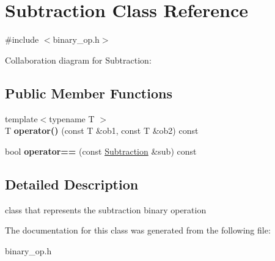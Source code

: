 \hypertarget{classSubtraction}{\section{Subtraction Class Reference}
\label{classSubtraction}
}


{\ttfamily \#include $<$binary\-\_\-op.\-h$>$}



Collaboration diagram for Subtraction\-:
\subsection*{Public Member Functions}
\begin{DoxyCompactItemize}
\item 
\hypertarget{classSubtraction_a6a5eda6df5da14d0d54e3414f655a10b}{{\footnotesize template$<$typename T $>$ }\\T {\bfseries operator()} (const T \&ob1, const T \&ob2) const }\label{classSubtraction_a6a5eda6df5da14d0d54e3414f655a10b}

\item 
\hypertarget{classSubtraction_a192b970e1a127e079f17bdaf3a4a1b8b}{bool {\bfseries operator==} (const \hyperlink{classSubtraction}{Subtraction} \&sub) const }\label{classSubtraction_a192b970e1a127e079f17bdaf3a4a1b8b}

\end{DoxyCompactItemize}


\subsection{Detailed Description}
class that represents the subtraction binary operation 

The documentation for this class was generated from the following file\-:\begin{DoxyCompactItemize}
\item 
binary\-\_\-op.\-h\end{DoxyCompactItemize}
